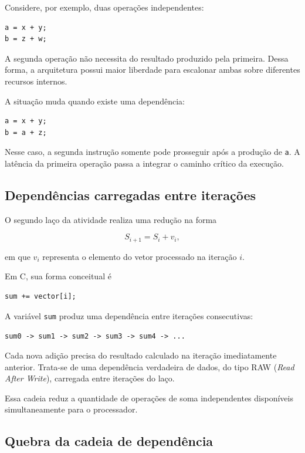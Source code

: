 Considere, por exemplo, duas operações independentes:

\begin{verbatim}
a = x + y;
b = z + w;
\end{verbatim}

A segunda operação não necessita do resultado produzido pela primeira. Dessa forma, a
arquitetura possui maior liberdade para escalonar ambas sobre diferentes recursos internos.

A situação muda quando existe uma dependência:

\begin{verbatim}
a = x + y;
b = a + z;
\end{verbatim}

Nesse caso, a segunda instrução somente pode prosseguir após a produção de \texttt{a}. A
latência da primeira operação passa a integrar o caminho crítico da execução.


\subsection{Dependências carregadas entre iterações}

O segundo laço da atividade realiza uma redução na forma

\begin{equation}
S_{i+1} = S_i + v_i,
\end{equation}

em que \(v_i\) representa o elemento do vetor processado na iteração \(i\).

Em C, sua forma conceitual é

\begin{verbatim}
sum += vector[i];
\end{verbatim}

A variável \texttt{sum} produz uma dependência entre iterações consecutivas:

\begin{center}
\texttt{sum0 -> sum1 -> sum2 -> sum3 -> sum4 -> ...}
\end{center}

Cada nova adição precisa do resultado calculado na iteração imediatamente anterior. Trata-se
de uma dependência verdadeira de dados, do tipo RAW (\textit{Read After Write}), carregada
entre iterações do laço.

Essa cadeia reduz a quantidade de operações de soma independentes disponíveis simultaneamente
para o processador.


\subsection{Quebra da cadeia de dependência}

